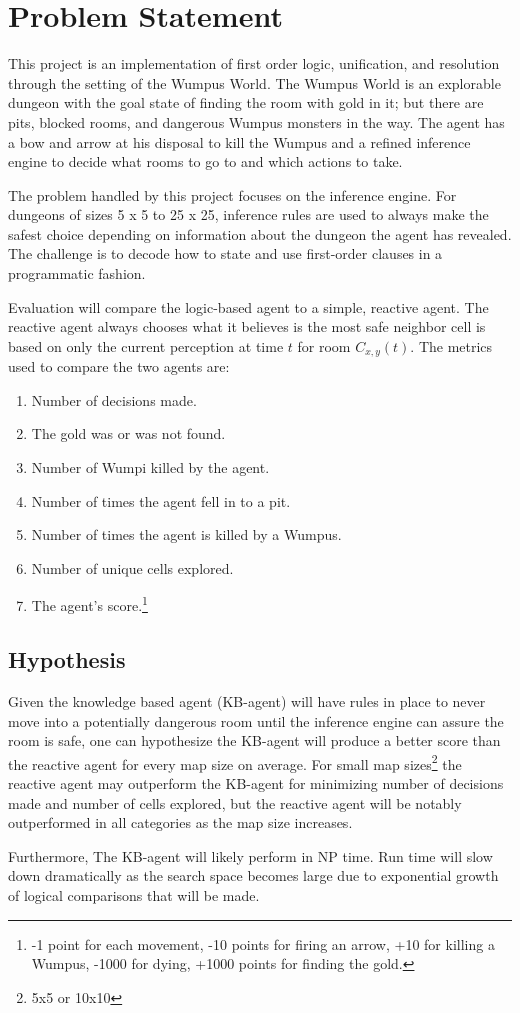 \section{Problem Statement} \label{sec:problem statement}
This project is an implementation of first order logic, unification, and resolution through the setting of the Wumpus World. 
The Wumpus World is an explorable dungeon with the goal state of finding the room with gold in it; but there are pits, blocked rooms, and dangerous Wumpus monsters in the way. 
The agent has a bow and arrow at his disposal to kill the Wumpus and a refined inference engine to decide what rooms to go to and which actions to take.

The problem handled by this project focuses on the inference engine.
For dungeons of sizes 5 x 5 to 25 x 25, inference rules are used to always make the safest choice depending on information about the dungeon the agent has revealed.
The challenge is to decode how to state and use first-order clauses in a programmatic fashion. 

Evaluation will compare the logic-based agent to a simple, reactive agent.
The reactive agent always chooses what it believes is the most safe neighbor cell is based on only the current perception at time $t$ for room $C_{x,y}(t)$.
The metrics used to compare the two agents are:
\begin{enumerate}
	\item Number of decisions made.
    \item The gold was or was not found.
    \item Number of Wumpi killed by the agent.
    \item Number of times the agent fell in to a pit.
    \item Number of times the agent is killed by a Wumpus.
    \item Number of unique cells explored.
    \item The agent's score.\footnote{-1 point for each movement, -10 points for firing an arrow, +10 for killing a Wumpus, -1000 for dying, +1000 points for finding the gold.}
\end{enumerate}

\subsection{Hypothesis} \label{subsec:hypothesis}
Given the knowledge based agent (KB-agent) will have rules in place to never move into a potentially dangerous room until the inference engine can assure the room is safe, one can hypothesize the KB-agent will produce a better score than the reactive agent for every map size on average. 
For small map sizes\footnote{5x5 or 10x10} the reactive agent may outperform the KB-agent for minimizing number of decisions made and number of cells explored, but the reactive agent will be notably outperformed in all categories as the map size increases.  

Furthermore, The KB-agent will likely perform in NP time.
Run time will slow down dramatically as the search space becomes large due to exponential growth of logical comparisons that will be made\cite{Ansari}.
